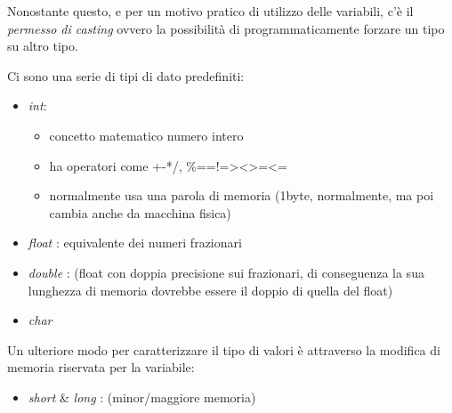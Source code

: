 \documentclass[
]{article}
\begin{document}
Nonostante questo, e per un motivo pratico di utilizzo delle variabili,
c'è il \emph{permesso di casting} ovvero la possibilità di
programmaticamente forzare un tipo su altro tipo.

Ci sono una serie di tipi di dato predefiniti:

\begin{itemize}
\item
  \emph{int}:

  \begin{itemize}
  \item
    concetto matematico numero intero
  \item
    ha operatori come +-*/,
    \%==!=\textgreater\textless\textgreater=\textless=
  \item
    normalmente usa una parola di memoria (1byte, normalmente, ma poi
    cambia anche da macchina fisica)
  \end{itemize}
\item
  \emph{float} : equivalente dei numeri frazionari
\item
  \emph{double} : (float con doppia precisione sui frazionari, di
  conseguenza la sua lunghezza di memoria dovrebbe essere il doppio di
  quella del float)
\item
  \emph{char}
\end{itemize}

Un ulteriore modo per caratterizzare il tipo di valori è attraverso la
modifica di memoria riservata per la variabile:

\begin{itemize}
\item
  \emph{short} \& \emph{long} : (minor/maggiore memoria)
\end{itemize}
\end{document}
